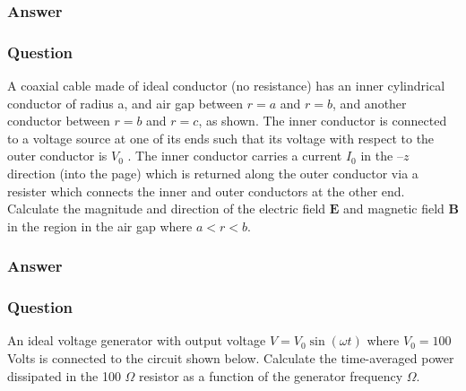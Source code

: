 \subsubsection{Answer}



\subsubsection{Question}
A coaxial cable made of ideal conductor (no resistance) has an inner cylindrical conductor of radius a, and air gap between $r = a$ and $r = b$, and another conductor between $r = b$ and $r = c$, as shown. The inner conductor is connected to a voltage source at one of its ends such that its voltage with respect to the outer conductor is $V_0$ . The inner conductor carries a current $I_0$ in the $–z$ direction (into the page) which is returned along the outer conductor via a resister which connects the inner and outer conductors at the other end. Calculate the magnitude and direction of the electric field $\mathbf{E}$ and magnetic field $\mathbf{B}$ in the region in the air gap where $a < r < b.$
\subsubsection{Answer}


\subsubsection{Question}
An ideal voltage generator with output voltage $V=V_0\sin(\omega t)$ where $V_0 = 100$ Volts is connected to the circuit shown below. Calculate the time-averaged power dissipated in the 100 $\Omega$ resistor as a function of the generator frequency $\Omega$.
